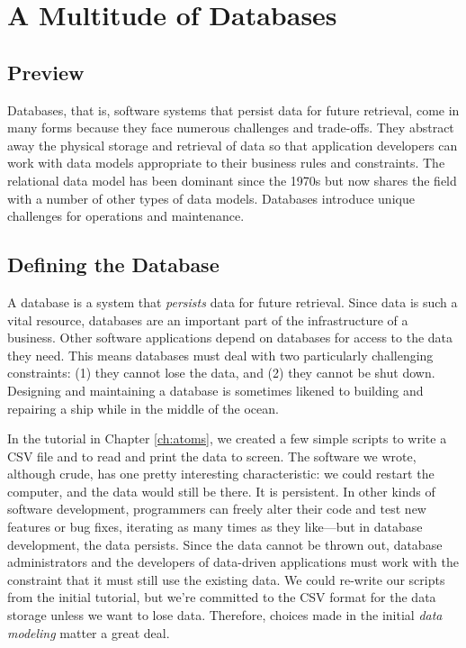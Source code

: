 \documentclass[11pt]{book}
\newcommand{\term}[1]{\emph{#1}} %
\begin{document}
\chapter{A Multitude of Databases}\label{ch:nosql}

\section*{Preview}

Databases, that is, software systems that persist data for future retrieval, come in many forms because they face numerous challenges and trade-offs.  They abstract away the physical storage and retrieval of data so that application developers can work with data models appropriate to their business rules and constraints.  The relational data model has been dominant since the 1970s but now shares the field with a number of other types of data models.  Databases introduce unique challenges for operations and maintenance.

\section{Defining the Database}
A database is a system that \term{persists} data for future retrieval.  Since data is such a vital resource, databases are an important part of the infrastructure of a business.  Other software applications depend on databases for access to the data they need.  This means databases must deal with two particularly challenging constraints: (1) they cannot lose the data, and (2) they cannot be shut down.  Designing and maintaining a database is sometimes likened to building and repairing a ship while in the middle of the ocean.

In the tutorial in Chapter \ref{ch:atoms}, we created a few simple scripts to write a CSV file and to read and print the data to screen.  The software we wrote, although crude, has one pretty interesting characteristic: we could restart the computer, and the data would still be there.  It is persistent.  In other kinds of software development, programmers can freely alter their code and test new features or bug fixes, iterating as many times as they like---but in database development, the data persists.  Since the data cannot be thrown out, database administrators and the developers of data-driven applications must work with the constraint that it must still use the existing data.  We could re-write our scripts from the initial tutorial, but we're committed to the CSV format for the data storage unless we want to lose data.  Therefore, choices made in the initial \term{data modeling} matter a great deal.
\end{document}
